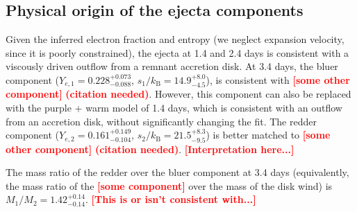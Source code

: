 \documentclass[twocolumn,twocolappendix]{aastex63}
\def\citneeded{\textcolor{red}{\textbf{(citation needed)}}}
\newcommand\redbf[1]{\textbf{\textcolor{red}{#1}}}
\begin{document}
\subsection{Physical origin of the ejecta components}\label{ssc:disco-origins}

 Given the inferred electron fraction and entropy (we neglect expansion velocity, since it is poorly constrained), the ejecta at 1.4 and 2.4 days is consistent with a viscously driven outflow from a remnant accretion disk. At 3.4 days, the bluer component ($Y_{e,1} = 0.228^{+0.073}_{-0.088}$, $s_1 / k_{\mathrm{B}} = 14.9^{+8.0}_{-4.5}$), is consistent with \redbf{[some other component]} \citneeded . However, this component can also be replaced with the purple + warm model of 1.4 days, which is consistent with an outflow from an accretion disk, without significantly changing the fit. The redder component ($Y_{e,2} = 0.161^{+0.149}_{-0.104}$, $s_2 / k_{\mathrm{B}} = 21.5^{+8.3}_{-9.5}$) is better matched to \redbf{[some other component]} \citneeded . \redbf{[Interpretation here...]}

 The mass ratio of the redder over the bluer component at 3.4 days (equivalently, the mass ratio of the \redbf{[some component]} over the mass of the disk wind) is $M_1 / M_2 = 1.42^{+0.14}_{-0.14}$. \redbf{[This is or isn't consistent with...]}









\end{document}
